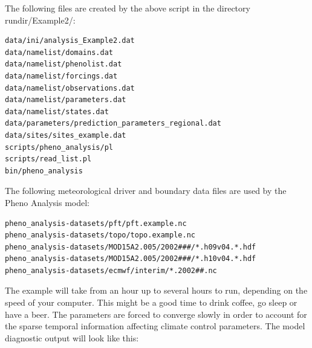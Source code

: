 \documentclass[a4paper,12pt]{article}
\begin{document}
The following files are created by the above script in the directory rundir/Example2/:
\begin{verbatim}
data/ini/analysis_Example2.dat
data/namelist/domains.dat
data/namelist/phenolist.dat
data/namelist/forcings.dat
data/namelist/observations.dat
data/namelist/parameters.dat
data/namelist/states.dat
data/parameters/prediction_parameters_regional.dat
data/sites/sites_example.dat
scripts/pheno_analysis/pl
scripts/read_list.pl
bin/pheno_analysis
\end{verbatim}
The following meteorological driver and boundary data files are used by the Pheno Analysis model:
\begin{verbatim}
pheno_analysis-datasets/pft/pft.example.nc
pheno_analysis-datasets/topo/topo.example.nc
pheno_analysis-datasets/MOD15A2.005/2002###/*.h09v04.*.hdf
pheno_analysis-datasets/MOD15A2.005/2002###/*.h10v04.*.hdf
pheno_analysis-datasets/ecmwf/interim/*.2002##.nc
\end{verbatim}
The example will take from an hour up to several hours to run, depending on the speed of your computer. This might be a good time to drink coffee, go sleep or have a beer. The parameters are forced to converge slowly in order to account for the sparse temporal information affecting climate control parameters. The model diagnostic output will look like this:
\end{document}
